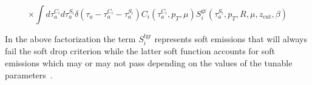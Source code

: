\begin{equation}
\times \int d \tau_{a}^{C_{i}} d \tau_{a}^{S_{i}} \delta\left(\tau_{a}-\tau_{a}^{C_{i}}-\tau_{a}^{S_{i}}\right) C_{i}\left(\tau_{a}^{C_{i}}, p_{T}, \mu\right) S_{i}^{\operatorname{gr}}\left(\tau_{a}^{S_{i}}, p_{T}, R, \mu, z_{\mathrm{cut}}, \beta\right)
\end{equation}

In the above factorization the term $S_{i}^{t \mathrm{gr}}$ represents soft emissions that will always fail the soft drop criterion while the latter soft function accounts for soft emissions which may or may not pass depending on the values of the tunable parameters~\cite{Kang:2018vgn}.


















